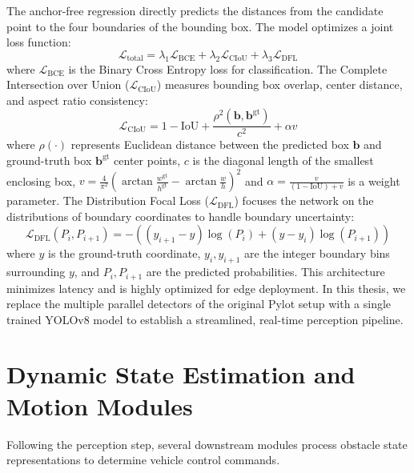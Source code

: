 \documentclass[11pt,a4paper]{report}
\begin{document}
The anchor-free regression directly predicts the distances from the candidate point to the four boundaries of the bounding box. The model optimizes a joint loss function:
\begin{equation}
    \mathcal{L}_{\text{total}} = \lambda_1 \mathcal{L}_{\text{BCE}} + \lambda_2 \mathcal{L}_{\text{CIoU}} + \lambda_3 \mathcal{L}_{\text{DFL}}
\end{equation}
where $\mathcal{L}_{\text{BCE}}$ is the Binary Cross Entropy loss for classification. The Complete Intersection over Union ($\mathcal{L}_{\text{CIoU}}$) measures bounding box overlap, center distance, and aspect ratio consistency:
\begin{equation}
    \mathcal{L}_{\text{CIoU}} = 1 - \text{IoU} + \frac{\rho^2(\mathbf{b}, \mathbf{b}^{\text{gt}})}{c^2} + \alpha v
\end{equation}
where $\rho(\cdot)$ represents Euclidean distance between the predicted box $\mathbf{b}$ and ground-truth box $\mathbf{b}^{\text{gt}}$ center points, $c$ is the diagonal length of the smallest enclosing box, $v = \frac{4}{\pi^2} (\arctan \frac{w^{\text{gt}}}{h^{\text{gt}}} - \arctan \frac{w}{h})^2$ and $\alpha = \frac{v}{(1-\text{IoU})+v}$ is a weight parameter. The Distribution Focal Loss ($\mathcal{L}_{\text{DFL}}$) focuses the network on the distributions of boundary coordinates to handle boundary uncertainty:
\begin{equation}
    \mathcal{L}_{\text{DFL}}(P_i, P_{i+1}) = - \left( (y_{i+1} - y) \log(P_i) + (y - y_i) \log(P_{i+1}) \right)
\end{equation}
where $y$ is the ground-truth coordinate, $y_i, y_{i+1}$ are the integer boundary bins surrounding $y$, and $P_i, P_{i+1}$ are the predicted probabilities. This architecture minimizes latency and is highly optimized for edge deployment. In this thesis, we replace the multiple parallel detectors of the original Pylot setup with a single trained YOLOv8 model to establish a streamlined, real-time perception pipeline.

\section{Dynamic State Estimation and Motion Modules}
\label{sec:estimation_motion}

Following the perception step, several downstream modules process obstacle state representations to determine vehicle control commands.
\end{document}
